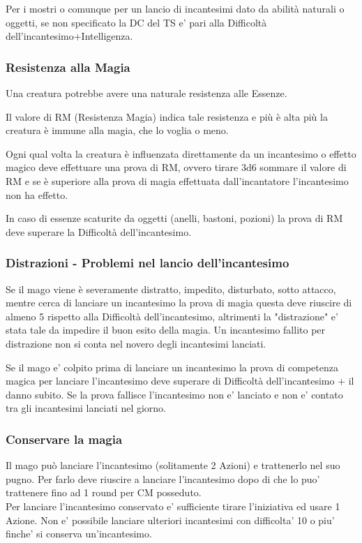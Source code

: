 Per i mostri o comunque per un lancio di incantesimi dato da abilità naturali o oggetti, se non specificato la DC del TS e' pari alla Difficoltà dell'incantesimo+Intelligenza.

\subsubsection{Resistenza alla Magia}

Una creatura potrebbe avere una naturale resistenza alle Essenze.

Il valore di RM (Resistenza Magia) indica tale resistenza e più è alta più la creatura è immune alla magia, che lo voglia o meno.

Ogni qual volta la creatura è influenzata direttamente da un incantesimo o effetto magico deve effettuare una prova di RM, ovvero tirare 3d6 sommare il valore di RM e se è superiore alla prova di magia effettuata dall'incantatore l'incantesimo non ha effetto.

In caso di essenze scaturite da oggetti (anelli, bastoni, pozioni) la prova di RM deve superare la Difficoltà dell'incantesimo.

\subsubsection{Distrazioni - Problemi nel lancio dell'incantesimo}

Se il mago viene è severamente distratto, impedito, disturbato, sotto attacco, mentre cerca di lanciare un incantesimo la prova di magia questa deve riuscire di almeno 5 rispetto alla Difficoltà dell'incantesimo, altrimenti la "distrazione" e' stata tale da impedire il buon esito della magia.
Un incantesimo fallito per distrazione non si conta nel novero degli incantesimi lanciati.

Se il mago e' colpito prima di lanciare un incantesimo la prova di competenza magica per lanciare l'incantesimo deve superare di Difficoltà dell'incantesimo + il danno subito. Se la prova fallisce l'incantesimo non e' lanciato e non e' contato tra gli incantesimi lanciati nel giorno.

\subsubsection{Conservare la magia}

Il mago può lanciare l'incantesimo (solitamente 2 Azioni) e trattenerlo nel suo pugno. Per farlo deve riuscire a lanciare l'incantesimo dopo di che lo puo' trattenere fino ad 1 round per CM posseduto.\\
Per lanciare l'incantesimo conservato e' sufficiente tirare l'iniziativa ed usare 1 Azione. Non e' possibile lanciare ulteriori incantesimi con difficolta' 10 o piu' finche' si conserva un'incantesimo.

